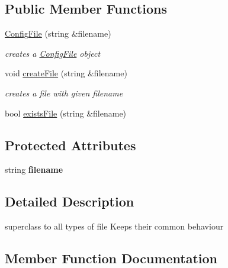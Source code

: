 \subsection*{Public Member Functions}
\begin{DoxyCompactItemize}
\item 
\hypertarget{class_config_file_a0f9b83c045bfe0ef78d008fa26d893c4}{}\hyperlink{class_config_file_a0f9b83c045bfe0ef78d008fa26d893c4}{Config\+File} (string \&filename)\label{class_config_file_a0f9b83c045bfe0ef78d008fa26d893c4}

\begin{DoxyCompactList}\small\item\em creates a \hyperlink{class_config_file}{Config\+File} object \end{DoxyCompactList}\item 
\hypertarget{class_config_file_a0a3050a665cd0c0d9eece2ba4690a43e}{}void \hyperlink{class_config_file_a0a3050a665cd0c0d9eece2ba4690a43e}{create\+File} (string \&filename)\label{class_config_file_a0a3050a665cd0c0d9eece2ba4690a43e}

\begin{DoxyCompactList}\small\item\em creates a file with given filename \end{DoxyCompactList}\item 
bool \hyperlink{class_config_file_a31ca66b91dfa8d9a7f1b37a01e57de3f}{exists\+File} (string \&filename)
\end{DoxyCompactItemize}
\subsection*{Protected Attributes}
\begin{DoxyCompactItemize}
\item 
\hypertarget{class_config_file_a89923d5ab6a13a1ceb0d10a6188765d3}{}string {\bfseries filename}\label{class_config_file_a89923d5ab6a13a1ceb0d10a6188765d3}

\end{DoxyCompactItemize}


\subsection{Detailed Description}
superclass to all types of file Keeps their common behaviour 

\subsection{Member Function Documentation}
\hypertarget{class_config_file_a31ca66b91dfa8d9a7f1b37a01e57de3f}{}
